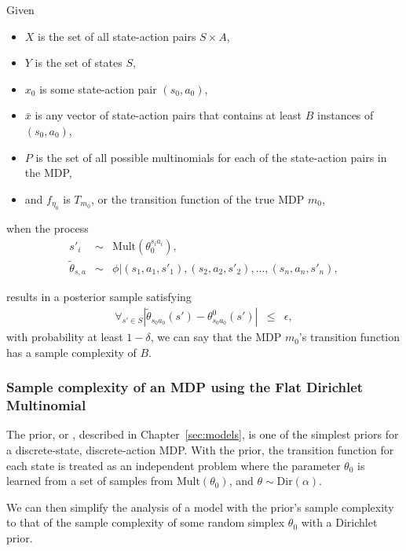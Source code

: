 Given
\begin{itemize}
\item $X$ is the set of all state-action pairs $S\times A$,
\item $Y$ is the set of states $S$,
\item $x_0$ is some state-action pair $(s_0, a_0)$,
\item $\bar x$ is any vector of state-action pairs that contains at least $B$ instances of $(s_0,a_0)$,
\item $P$ is the set of all possible multinomials for each of the state-action pairs in the MDP,
\item and $f_{\eta_0}$ is $T_{m_0}$, or the transition function of the true MDP $m_0$,
\end{itemize}
when the process
\begin{eqnarray}
s'_i &\sim& \mbox{Mult}(\theta_0^{s_i a_i}),\\
\tilde \theta_{s,a} &\sim& \phi|(s_1,a_1,s'_1),(s_2,a_2,s'_2),...,(s_n,a_n,s'_n),
\end{eqnarray}


results in a posterior sample satisfying
\begin{eqnarray}
\forall_{s'\in S} |\tilde\theta_{s_0 a_0}(s') - \theta^0_{s_0 a_0}(s')| & \leq & \epsilon,
\end{eqnarray}
with probability at least $1-\delta$, we can say that the MDP $m_0$'s transition function has a sample complexity of $B$.

\subsubsection{Sample complexity of an MDP using the Flat Dirichlet Multinomial}

The  prior, or , described in Chapter~\ref{sec:models}, is one of the simplest priors for a discrete-state, discrete-action MDP. With the  prior, the transition function for each state is treated as an independent problem where the parameter $\theta_0$ is learned from a set of samples from $\mbox{Mult}(\theta_0)$, and $\theta \sim \mbox{Dir}(\alpha)$.

We can then simplify the analysis of a model with the  prior's sample complexity to that of the sample complexity of some random simplex $\theta_0$ with a Dirichlet prior.

